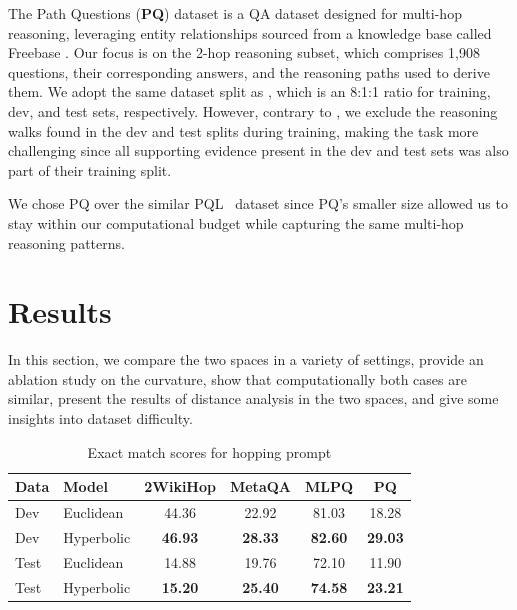 \documentclass[11pt]{article}
\begin{document}
\noindent
The Path Questions (\textbf{PQ}) dataset \cite{zhou2018interpretable} is a QA dataset designed for multi-hop reasoning, leveraging entity relationships sourced from a knowledge base called Freebase \cite{bollacker2008freebase}. Our focus is on the 2-hop reasoning subset, which comprises 1,908 questions, their corresponding answers, and the reasoning paths used to derive them. We adopt the same dataset split as \citet{wang2024hypermr}, which is an 8:1:1 ratio for training, dev, and test sets, respectively. However, contrary to \citet{wang2024hypermr}, we exclude the reasoning walks found in the dev and test splits during training, making the task more challenging since all supporting evidence present in the dev and test sets was also part of their training split. 

We chose PQ over the similar PQL~\cite{zhou-etal-2018-interpretable} dataset since PQ’s smaller size allowed us to stay within our computational budget while capturing the same multi-hop reasoning patterns.


\section{Results}
In this section, we compare the two spaces in a variety of settings, provide an ablation study on the curvature, show that computationally both cases are similar, present the results of distance analysis in the two spaces, and give some insights into dataset difficulty.

\begin{table}
\centering
\small
\setlength{\tabcolsep}{3.0pt}
\begin{tabularx}{\columnwidth}{Xlcccc}
\toprule
Data&Model &2WikiHop & MetaQA & MLPQ & PQ \\ 
\midrule 
Dev&Euclidean & 44.36 & 22.92 & 81.03 & 18.28 \\ 
Dev&Hyperbolic & \textbf{46.93} & \textbf{28.33} & \textbf{82.60} & \textbf{29.03} \\ 
\midrule
Test&Euclidean & 14.88 & 19.76 & 72.10 & 11.90\\ 
Test&Hyperbolic & \textbf{15.20} & \textbf{25.40} & \textbf{74.58} & \textbf{23.21} \\ 
\bottomrule
\end{tabularx}
\caption{Exact match scores for hopping prompt}
\label{tab:performance_hopping_val}
\end{table}
\end{document}
